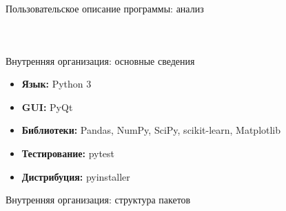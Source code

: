 \documentclass[aspectratio=169,tikz]{beamer}
\begin{document}
\begin{frame}{Пользовательское описание программы: анализ}
\begin{columns}
\begin{figure}[T]
		\end{figure}
	\end{columns}
	\end{frame}	


	\begin{frame}{Внутренняя организация: основные сведения}
	\begin{itemize}
		\item \textbf{Язык:} Python 3\\
		\item \textbf{GUI:} PyQt\\
		\item \textbf{Библиотеки:} Pandas, NumPy, SciPy, scikit-learn, Matplotlib
		\item \textbf{Тестирование:} pytest
		\item \textbf{Дистрибуция:} pyinstaller
	\end{itemize}
	\end{frame}

	\begin{frame}{Внутренняя организация: структура пакетов}
		\begin{figure}[T] %
		\centering
		
		\end{figure}
	\end{frame}
\end{document}
